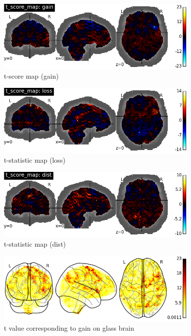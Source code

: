 \begin{figure}[h!]
\centering
\includegraphics[width=100mm]{images/t_scores_gain.png}               
\caption{t-score map (gain)}
\label{fig:t_gain}
\end{figure}

\begin{figure}[h!]
\centering
\includegraphics[width=100mm]{images/t_scores_loss.png}               
\caption{t-statistic map (loss)}
\label{fig:t_loss}
\end{figure}

\begin{figure}[h!]
\centering
\includegraphics[width=100mm]{images/t_scores_dist.png}               
\caption{t-statistic map (dist)}
\label{fig:t_dist}
\end{figure}

\begin{figure}[h!]
\centering
\includegraphics[width=100mm]{images/t_glass_brain_gain.png}               
\caption{t value corresponding to gain on glass brain}
\label{fig:t_glass1}
\end{figure}

